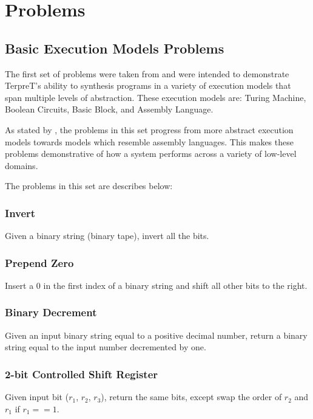 
\section{Problems}
\subsection{Basic Execution Models Problems}
The first set of problems were taken from \cite{Gaunt2016} and were intended to demonstrate TerpreT's ability to synthesis programs in a variety of execution models that span multiple levels of abstraction. These execution models are: Turing Machine, Boolean Circuits, Basic Block, and Assembly Language. 

As stated by \cite{Gaunt2016}, the problems in this set progress from more abstract execution models towards models which resemble assembly languages. This makes these problems demonstrative of how a system performs across a variety of low-level domains. 
 
The problems in this set are describes below:

\subsubsection{Invert}

Given a binary string (binary tape), invert all the bits.

\subsubsection{Prepend Zero}

Insert a $0$ in the first index of a binary string and shift all other bits to the right.

\subsubsection{Binary Decrement}

Given an input binary string equal to a positive decimal number, return a binary string equal to the input number decremented by one.

\subsubsection{2-bit Controlled Shift Register}

Given input bit ($r_1$, $r_2$, $r_3$), return the same bits, except swap the order of $r_2$ and $r_1$ if $r_1 == 1$.

